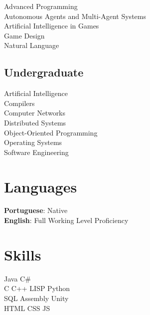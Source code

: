 \documentclass[letterpaper]{deedy-resume} %
\begin{document}
\begin{minipage}[t]{0.33\textwidth}
Advanced Programming \\
Autonomous Agents and Multi-Agent Systems \\
Artificial Intelligence in Games \\
Game Design\\
Natural Language \\

\sectionspace %


\subsection{Undergraduate}

Artificial Intelligence\\
Compilers\\
Computer Networks\\
Distributed Systems\\
Object-Oriented Programming\\
Operating Systems\\
Software Engineering\\
\sectionspace %



\section{Languages} 
\textbf{Portuguese}: Native\\
\textbf{English}: Full Working Level Proficiency\\

\sectionspace %


\section{Skills}


Java \textbullet{} C\#\\
C \textbullet{} C++ \textbullet{} LISP \textbullet{}  Python  \\
SQL \textbullet{} Assembly \textbullet{} Unity\\
HTML \textbullet{} CSS \textbullet{} JS\\


\sectionspace %

\end{minipage} %
\end{document}
